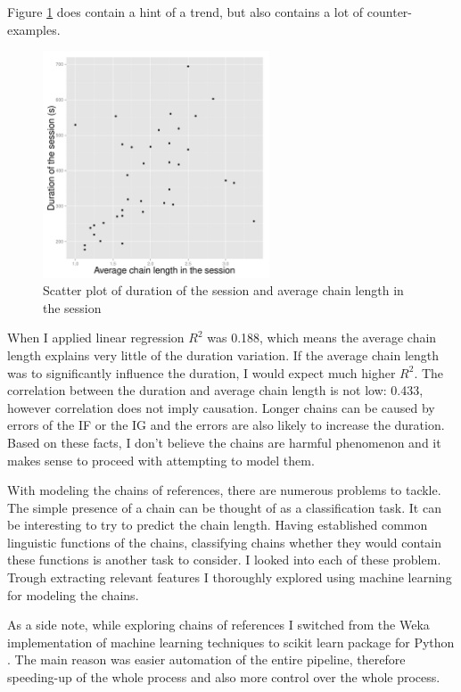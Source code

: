 Figure \ref{fig:chains_dur_scatter} does contain a hint of a trend, but also contains a lot of counter-examples. 

\begin{figure}[!htbp]
  \centering
	\includegraphics[width=0.6\textwidth]{Images/Chains-duration-LR}
	\caption{Scatter plot of duration of the session and average chain length in the session}
	\label{fig:chains_dur_scatter}
\end{figure}

When I applied linear regression $R^2$ was 0.188, which means the average chain length explains very little of the duration variation. If the average chain length was to significantly influence the duration, I would expect much higher $R^2$. The correlation between the duration and average chain length is not low: 0.433, however correlation does not imply causation. Longer chains can be caused by errors of the IF or the IG and the errors are also likely to increase the duration. Based on these facts, I don't believe the chains are harmful phenomenon and it makes sense to proceed with attempting to model them. 

With modeling the chains of references, there are numerous problems to tackle. The simple presence of a chain can be thought of as a classification task. It can be interesting to try to predict the chain length. Having established common linguistic functions of the chains, classifying chains whether they would contain these functions is another task to consider. I looked into each of these problem. Trough extracting relevant features I thoroughly explored using machine learning for modeling the chains.

As a side note, while exploring chains of references I switched from the Weka implementation of machine learning techniques \citep{hall2009weka} to scikit learn package for Python \citep{scikit-learn}. The main reason was easier automation of the entire pipeline, therefore speeding-up of the whole process and also more control over the whole process.

